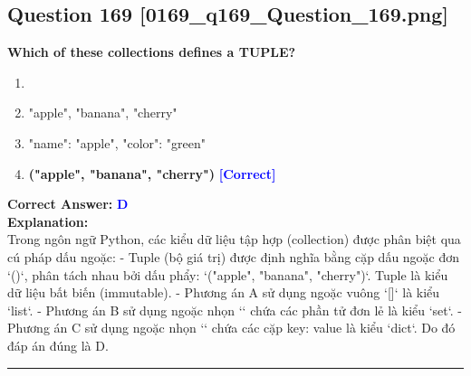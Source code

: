 \documentclass[11pt,a4paper]{article}
\begin{document}
\begin{minipage}{\textwidth}
\subsection*{Question 169 \quad \footnotesize{[0169_q169_Question_169.png]}}
\noindent \textbf{Which of these collections defines a TUPLE?}

\begin{enumerate}[label=\Alph*.]
    \item ["apple", "banana", "cherry"]
    \item "apple", "banana", "cherry"
    \item "name": "apple", "color": "green"
    \item \textbf{("apple", "banana", "cherry")} \hfill \textcolor{blue}{\textbf{[Correct]}}
\end{enumerate}

\noindent \textbf{Correct Answer:} \textcolor{blue}{\textbf{D}} \\[4pt]
\noindent \textbf{Explanation:}\\
Trong ngôn ngữ Python, các kiểu dữ liệu tập hợp (collection) được phân biệt qua cú pháp dấu ngoặc:\newline
- Tuple (bộ giá trị) được định nghĩa bằng cặp dấu ngoặc đơn `()`, phân tách nhau bởi dấu phẩy: `("apple", "banana", "cherry")`. Tuple là kiểu dữ liệu bất biến (immutable).\newline
- Phương án A sử dụng ngoặc vuông `[]` là kiểu `list`.\newline
- Phương án B sử dụng ngoặc nhọn `{}` chứa các phần tử đơn lẻ là kiểu `set`.\newline
- Phương án C sử dụng ngoặc nhọn `{}` chứa các cặp key: value là kiểu `dict`.\newline
Do đó đáp án đúng là D.
\end{minipage}
\vspace{0.8cm}
\hrule
\vspace{0.5cm}
\end{document}

